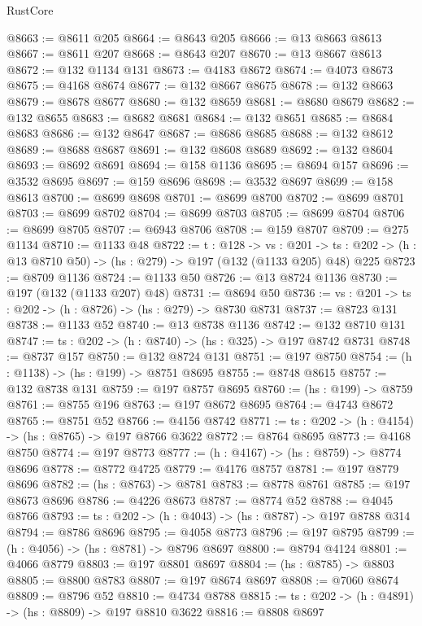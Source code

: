 \begin{lexlean}{RustCore}
\begin{coremodule}
@8663 := @8611 @205
@8664 := @8643 @205
@8666 := @13 @8663 @8613
@8667 := @8611 @207
@8668 := @8643 @207
@8670 := @13 @8667 @8613
@8672 := @132 @1134 @131
@8673 := @4183 @8672
@8674 := @4073 @8673
@8675 := @4168 @8674
@8677 := @132 @8667 @8675
@8678 := @132 @8663
@8679 := @8678 @8677
@8680 := @132 @8659
@8681 := @8680 @8679
@8682 := @132 @8655
@8683 := @8682 @8681
@8684 := @132 @8651
@8685 := @8684 @8683
@8686 := @132 @8647
@8687 := @8686 @8685
@8688 := @132 @8612
@8689 := @8688 @8687
@8691 := @132 @8608 @8689
@8692 := @132 @8604
@8693 := @8692 @8691
@8694 := @158 @1136
@8695 := @8694 @157
@8696 := @3532 @8695
@8697 := @159 @8696
@8698 := @3532 @8697
@8699 := @158 @8613
@8700 := @8699 @8698
@8701 := @8699 @8700
@8702 := @8699 @8701
@8703 := @8699 @8702
@8704 := @8699 @8703
@8705 := @8699 @8704
@8706 := @8699 @8705
@8707 := @6943 @8706
@8708 := @159 @8707
@8709 := @275 @1134
@8710 := @1133 @48
@8722 := {t : @128} ->
  {vs : @201} ->
  {ts : @202} -> (h : @13 @8710 @50) -> (hs : @279) -> @197 (@132 (@1133 @205) @48) @225
@8723 := @8709 @1136
@8724 := @1133 @50
@8726 := @13 @8724 @1136
@8730 := @197 (@132 (@1133 @207) @48)
@8731 := @8694 @50
@8736 := {vs : @201} -> {ts : @202} -> (h : @8726) -> (hs : @279) -> @8730 @8731
@8737 := @8723 @131
@8738 := @1133 @52
@8740 := @13 @8738 @1136
@8742 := @132 @8710 @131
@8747 := {ts : @202} -> (h : @8740) -> (hs : @325) -> @197 @8742 @8731
@8748 := @8737 @157
@8750 := @132 @8724 @131
@8751 := @197 @8750
@8754 := (h : @1138) -> (hs : @199) -> @8751 @8695
@8755 := @8748 @8615
@8757 := @132 @8738 @131
@8759 := @197 @8757 @8695
@8760 := (hs : @199) -> @8759
@8761 := @8755 @196
@8763 := @197 @8672 @8695
@8764 := @4743 @8672
@8765 := @8751 @52
@8766 := @4156 @8742
@8771 := {ts : @202} -> (h : @4154) -> (hs : @8765) -> @197 @8766 @3622
@8772 := @8764 @8695
@8773 := @4168 @8750
@8774 := @197 @8773
@8777 := (h : @4167) -> (hs : @8759) -> @8774 @8696
@8778 := @8772 @4725
@8779 := @4176 @8757
@8781 := @197 @8779 @8696
@8782 := (hs : @8763) -> @8781
@8783 := @8778 @8761
@8785 := @197 @8673 @8696
@8786 := @4226 @8673
@8787 := @8774 @52
@8788 := @4045 @8766
@8793 := {ts : @202} -> (h : @4043) -> (hs : @8787) -> @197 @8788 @314
@8794 := @8786 @8696
@8795 := @4058 @8773
@8796 := @197 @8795
@8799 := (h : @4056) -> (hs : @8781) -> @8796 @8697
@8800 := @8794 @4124
@8801 := @4066 @8779
@8803 := @197 @8801 @8697
@8804 := (hs : @8785) -> @8803
@8805 := @8800 @8783
@8807 := @197 @8674 @8697
@8808 := @7060 @8674
@8809 := @8796 @52
@8810 := @4734 @8788
@8815 := {ts : @202} -> (h : @4891) -> (hs : @8809) -> @197 @8810 @3622
@8816 := @8808 @8697

\end{coremodule}
\end{lexlean}
